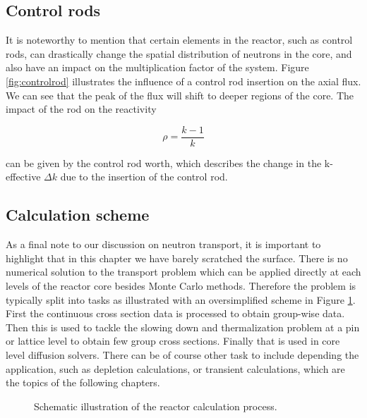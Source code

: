 \subsection{Control rods}

It is noteworthy to mention that certain elements in the reactor, such as control rods, can drastically change the spatial distribution of neutrons in the core, and also have an impact on the multiplication factor of the system. Figure \ref{fig:controlrod} illustrates the influence of a control rod insertion on the axial flux. We can see that the peak of the flux will shift to deeper regions of the core. The impact of the rod on the reactivity 

\[
\rho=\frac{k-1}{k}
\]

\noindent can be given by the control rod worth, which describes the change in the k-effective $\Delta k$ due to the insertion of the control rod.  

\subsection{Calculation scheme}

As a final note to our discussion on neutron transport, it is important to highlight that in this chapter we have barely scratched the surface. There is no numerical solution to the transport problem which can be applied directly at each levels of the reactor core besides Monte Carlo methods. Therefore the problem is typically split into tasks as illustrated with an oversimplified scheme in Figure \ref{fig:calculationscheme}. First the continuous cross section data is processed to obtain group-wise data. Then this is used to tackle the slowing down and thermalization problem at a pin or lattice level to obtain few group cross sections. Finally that is used in core level diffusion solvers. There can be of course other task to include depending the application, such as depletion calculations, or transient calculations, which are the topics of the following chapters.

\begin{figure}[ht!]
\protect {}\protect
\caption{\label{fig:calculationscheme} \footnotesize{Schematic illustration of the reactor calculation process.}}
\end{figure} 


%
